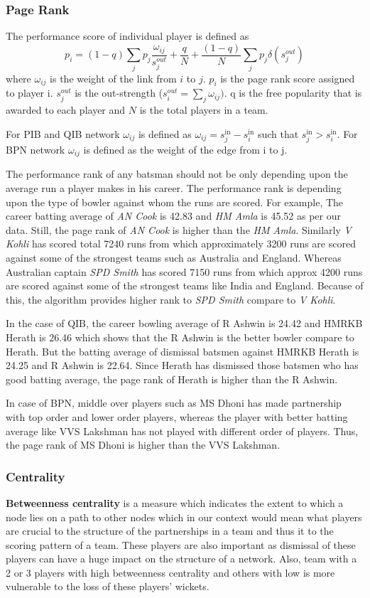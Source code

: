 \documentclass{article}
\begin{document}
\subsubsection{Page Rank}
The performance score of individual player is defined as $$p_i = (1 - q)\sum_{j}p_j\frac{\omega_{ij}}{s_j^{out}} + \frac{q}{N} + \frac{(1 - q)}{N}\sum_{j}p_j\delta(s_j^{out})$$
where $\omega_{ij}$ is the weight of the link from $i$ to $j$. $p_i$ is the page rank score assigned to player i. $s_j^{out}$ is the out-strength ($s^{out}_{i} = \sum_{j}\omega_{ij})$. q is the free popularity that is awarded to each player and $N$ is the total players in a team. 

For PIB and QIB network $\omega_{ij}$ is defined as $\omega_{ij} = s_j^{\mathrm{in}} - s_i^{\mathrm{in}}$ such that $s_j^{\mathrm{in}} > s_i^{\mathrm{in}}$. For BPN network $\omega _{ij}$ is defined as the weight of the edge from i to j.

The performance rank of any batsman should not be only depending upon the average run a player makes in his career. The performance rank is depending upon the type of bowler against whom the runs are scored. For example, The career batting average of \textit{AN Cook} is 42.83 and \textit{HM Amla} is 45.52 as per our data. Still, the page rank of \textit{AN Cook} is higher than the \textit{HM Amla}. Similarly \textit{V Kohli} has scored total 7240 runs from which approximately 3200 runs are scored against some of the strongest teams such as Australia and England. Whereas Australian captain \textit{SPD Smith} has scored 7150 runs from which approx 4200 runs are scored against some of the strongest teams like India and England. Because of this, the algorithm provides higher rank to \textit{SPD Smith} compare to \textit{V Kohli}.       

In the case of QIB, the career bowling average of R Ashwin is 24.42 and HMRKB Herath is 26.46 which shows that the R Ashwin is the better bowler compare to Herath. But the batting average of dismissal batsmen against HMRKB Herath is 24.25 and R Ashwin is 22.64. Since Herath has dismissed those batsmen who has good batting average, the page rank of Herath is higher than the R Ashwin.  

In case of BPN, middle over players such as MS Dhoni has made partnership with top order and lower order players, whereas the player with better batting average like VVS Lakshman has not played with different order of players. Thus, the page rank of MS Dhoni is higher than the VVS Lakshman. 
\subsubsection{Centrality} 
\textbf{Betweenness centrality} is a measure which indicates the extent to which a node lies on a path to other nodes which in our context would mean what players are crucial to the structure of the partnerships in a team and thus it to the scoring pattern of a team. These players are also important as dismissal of these players can have a huge impact on the structure of a network. Also, team with a 2 or 3 players with high betweenness centrality and others with low is more vulnerable to the loss of these players' wickets.
\end{document}
